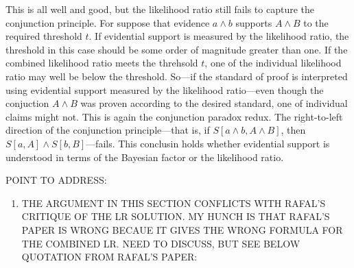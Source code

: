 \documentclass[10pt,dvipsnames,enabledeprecatedfontcommands]{scrartcl}
\providecommand{\tightlist}{%
  \setlength{\itemsep}{0pt}\setlength{\parskip}{0pt}}
\newcommand{\et}{\wedge}
\begin{document}
This is all well and good, but the likelihood ratio still fails to
capture the conjunction principle. For suppose that evidence \(a \et b\)
supports \(A \et B\) to the required threshold \(t\). If evidential
support is measured by the likelihood ratio, the threshold in this case
should be some order of magnitude greater than one. If the combined
likelihood ratio meets the threhsold \(t\), one of the individual
likelihood ratio may well be below the threshold. So---if the standard
of proof is interpreted using evidential support measured by the
likelihood ratio---even though the conjuction \(A \et B\) was proven
according to the desired standard, one of individual claims might not.
This is again the conjunction paradox redux. The right-to-left direction
of the conjunction principle---that is, if \(S[a \et b, A \et B]\), then
\(S[a, A] \et S[b, B]\)---fails. This conclusin holds whether evidential
support is understood in terms of the Bayesian factor or the likelihood
ratio.

POINT TO ADDRESS:

\begin{enumerate}
\def\labelenumi{(\arabic{enumi})}
\tightlist
\item
  THE ARGUMENT IN THIS SECTION CONFLICTS WITH RAFAL'S CRITIQUE OF THE LR
  SOLUTION. MY HUNCH IS THAT RAFAL'S PAPER IS WRONG BECAUE IT GIVES THE
  WRONG FORMULA FOR THE COMBINED LR. NEED TO DISCUSS, BUT SEE BELOW
  QUOTATION FROM RAFAL'S PAPER:
\end{enumerate}
\end{document}
